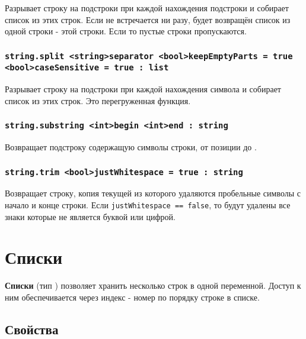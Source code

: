 \documentclass[a4paper, 14pt]{extarticle}
\begin{document}
Разрывает строку на подстроки при каждой нахождения подстроки  и собирает список из этих строк. Если  не встречается ни разу, будет возвращён список из одной строки - этой строки. Если  то пустые строки пропускаются.

\subsubsection{\lstinline|string.split <string>separator <bool>keepEmptyParts = true <bool>caseSensitive = true : list|}

Разрывает строку на подстроки при каждой нахождения символа  и собирает список из этих строк. Это перегруженная функция.

\subsubsection{\lstinline|string.substring <int>begin <int>end : string|}

Возвращает подстроку содержащую символы строки, от позиции  до .

\subsubsection{\lstinline|string.trim <bool>justWhitespace = true : string|}

Возвращает строку, копия текущей из которого удаляются пробельные символы с начало и конце строки. Если \lstinline|justWhitespace == false|, то будут удалены все знаки которые не является буквой или цифрой.


\section{Списки}

{\bf Списки} (тип ) позволяет хранить несколько строк в одной переменной. Доступ к ним обеспечивается через индекс - номер по порядку строке в списке.

\subsection{Свойства}
\end{document}
